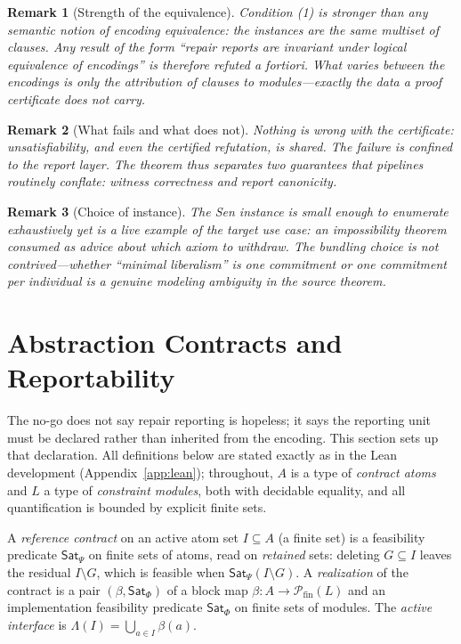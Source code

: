 \documentclass[sigplan,10pt,review,anonymous]{acmart}
\theoremstyle{acmdefinition}
\newtheorem{remark}{Remark}
\newcommand{\Lam}{\Lambda}
\newcommand{\SatPsi}{{\mathsf{Sat}_\Psi}}
\newcommand{\SatPhi}{{\mathsf{Sat}_\Phi}}
\begin{document}
\begin{remark}[Strength of the equivalence]
Condition (1) is stronger than any semantic notion of encoding equivalence:
the instances are the \emph{same multiset of clauses}. Any result of the form
``repair reports are invariant under logical equivalence of encodings''
is therefore refuted a fortiori. What varies between the encodings is only
the attribution of clauses to modules---exactly the data a proof certificate
does not carry.
\end{remark}

\begin{remark}[What fails and what does not]
Nothing is wrong with the certificate: unsatisfiability, and even the
certified refutation, is shared. The failure is confined to the report layer.
The theorem thus separates two guarantees that pipelines routinely conflate:
\emph{witness correctness} and \emph{report canonicity}.
\end{remark}

\begin{remark}[Choice of instance]
The Sen instance is small enough to enumerate exhaustively yet is a live
example of the target use case: an impossibility theorem consumed as advice
about which axiom to withdraw. The bundling choice is not contrived---whether
``minimal liberalism'' is one commitment or one commitment per individual is
a genuine modeling ambiguity in the source theorem.
\end{remark}

\section{Abstraction Contracts and Reportability}
\label{sec:contracts}

The no-go does not say repair reporting is hopeless; it says the reporting
unit must be declared rather than inherited from the encoding. This section
sets up that declaration. All definitions below are stated exactly as in the
Lean development (Appendix~\ref{app:lean}); throughout, $A$ is a type of
\emph{contract atoms} and $L$ a type of \emph{constraint modules}, both with
decidable equality, and all quantification is bounded by explicit finite
sets.

\begin{definition}
\label{def:contract}
A \emph{reference contract} on an active atom set $I \subseteq A$ (a finite
set) is a feasibility predicate $\SatPsi$ on finite sets of atoms, read on
\emph{retained} sets: deleting $G \subseteq I$ leaves the residual
$I \setminus G$, which is feasible when $\SatPsi(I \setminus G)$. A
\emph{realization} of the contract is a pair $(\beta, \SatPhi)$ of a block
map $\beta : A \to \mathcal{P}_{\mathrm{fin}}(L)$ and an implementation
feasibility predicate $\SatPhi$ on finite sets of modules. The \emph{active
interface} is $\Lam(I) = \bigcup_{a \in I} \beta(a)$.
\end{definition}
\end{document}

